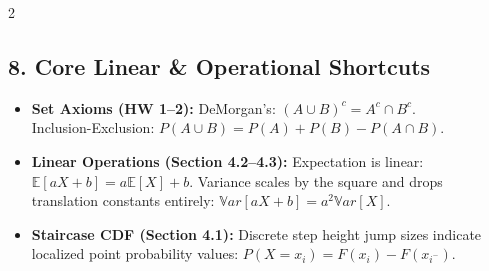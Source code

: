 \documentclass[9pt,landscape]{article}
\newcommand{\Var}{\mathbb{V}ar}
\newcommand{\E}{\mathbb{E}}
\begin{document}
\begin{multicols*}{2}
\subsection*{8. Core Linear \& Operational Shortcuts}
\begin{itemize}
    \item \textbf{Set Axioms (HW 1--2):} DeMorgan's: $(A \cup B)^c = A^c \cap B^c$. \\
    Inclusion-Exclusion: $P(A \cup B) = P(A) + P(B) - P(A \cap B)$.
    \item \textbf{Linear Operations (Section 4.2--4.3):} Expectation is linear: $\E[aX + b] = a\E[X] + b$. Variance scales by the square and drops translation constants entirely: $\Var[aX + b] = a^2\Var[X]$.
    \item \textbf{Staircase CDF (Section 4.1):} Discrete step height jump sizes indicate localized point probability values: $P(X=x_i) = F(x_i) - F(x_{i^-})$.
\end{itemize}

\end{multicols*}
\end{document}
